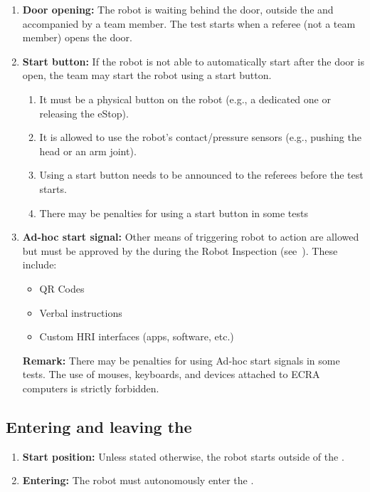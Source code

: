 \begin{enumerate}
	\item \textbf{Door opening:} The robot is waiting behind the door, outside the \Arena{} and accompanied by a team member.
	The test starts when a referee (not a team member) opens the door.

	\item \textbf{Start button:} If the robot is not able to automatically start after the door is open, the team may start the robot using a start button.
	\begin{enumerate}[nosep]
		\item It must be a physical button on the robot (e.g., a dedicated one or releasing the eStop).
		\item It is allowed to use the robot's contact/pressure sensors (e.g., pushing the head or an arm joint).
		\item Using a start button needs to be announced to the referees before the test starts.
		\item There may be penalties for using a start button in some tests
	\end{enumerate}

	\item \textbf{Ad-hoc start signal:} Other means of triggering robot to action are allowed but must be approved by the  during the Robot Inspection (see~).
	These include:
	\begin{itemize}[nosep]
		\item QR Codes
		\item Verbal instructions
		\item Custom HRI interfaces (apps, software, etc.)
	\end{itemize}
	\textbf{Remark:} There may be penalties for using Ad-hoc start signals in some tests. The use of mouses, keyboards, and devices attached to ECRA computers is strictly forbidden.

\end{enumerate}


\subsection{Entering and leaving the \Arena{}}
\label{rule:start_position}
\begin{enumerate}

	\item \textbf{Start position:} Unless stated otherwise, the robot starts outside of the \Arena{}.
	\item \textbf{Entering:} The robot must autonomously enter the \Arena{}.
\end{enumerate}




